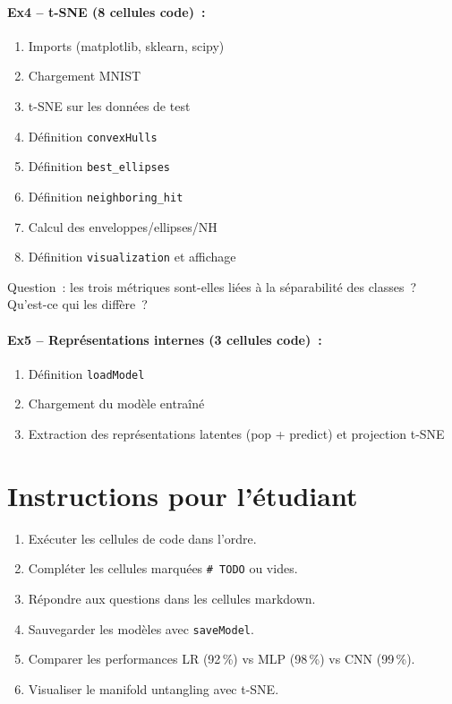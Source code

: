 \documentclass[a4paper,11pt]{article}
\begin{document}
\paragraph{Ex4 -- t-SNE (8 cellules code)~:}
\begin{enumerate}
  \item Imports (matplotlib, sklearn, scipy)
  \item Chargement MNIST
  \item t-SNE sur les donn\'ees de test
  \item D\'efinition \texttt{convexHulls}
  \item D\'efinition \texttt{best\_ellipses}
  \item D\'efinition \texttt{neighboring\_hit}
  \item Calcul des enveloppes/ellipses/NH
  \item D\'efinition \texttt{visualization} et affichage
\end{enumerate}

Question~: les trois m\'etriques sont-elles li\'ees \`a la
s\'eparabilit\'e des classes~? Qu'est-ce qui les diff\`ere~?

\paragraph{Ex5 -- Repr\'esentations internes (3 cellules code)~:}
\begin{enumerate}
  \item D\'efinition \texttt{loadModel}
  \item Chargement du mod\`ele entra\^in\'e
  \item Extraction des repr\'esentations latentes (pop + predict)
    et projection t-SNE
\end{enumerate}

\section{Instructions pour l'\'etudiant}

\begin{enumerate}
  \item Ex\'ecuter les cellules de code dans l'ordre.
  \item Compl\'eter les cellules marqu\'ees \texttt{\# TODO} ou
    vides.
  \item R\'epondre aux questions dans les cellules markdown.
  \item Sauvegarder les mod\`eles avec \texttt{saveModel}.
  \item Comparer les performances LR (92\,\%) vs MLP (98\,\%)
    vs CNN (99\,\%).
  \item Visualiser le manifold untangling avec t-SNE.
\end{enumerate}
\end{document}
